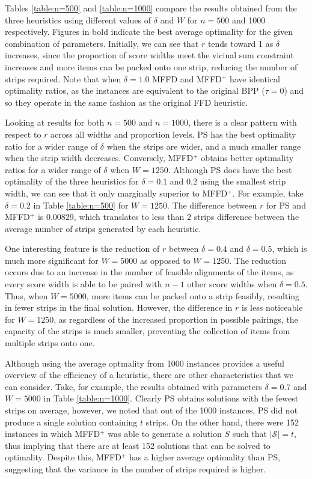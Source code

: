 \documentclass[oribibl]{llncs}
\begin{document}
Tables \ref{table:n=500} and \ref{table:n=1000} compare the results obtained from the three heuristics using different values of $\delta$ and $W$ for $n = 500$ and 1000 respectively. Figures in bold indicate the best average optimality for the given combination of parameters. Initially, we can see that $r$ tends toward 1 as $\delta$ increases, since the proportion of score widths meet the vicinal sum constraint increases and more items can be packed onto one strip, reducing the number of strips required. Note that when $\delta = 1.0$ MFFD and MFFD$^+$ have identical optimality ratios, as the instances are equivalent to the original BPP ($\tau = 0$) and so they operate in the same fashion as the original FFD heuristic.

Looking at results for both $n = 500$ and $n = 1000$, there is a clear pattern with respect to $r$ across all widths and proportion levels. PS has the best optimality ratio for a wider range of $\delta$ when the strips are wider, and a much smaller range when the strip width decreases. Conversely, MFFD$^+$ obtains better optimality ratios for a wider range of $\delta$ when $W = 1250$. Although PS does have the best optimality of the three heuristics for $\delta = 0.1$ and 0.2 using the smallest strip width, we can see that it only marginally superior to MFFD$^+$. For example, take $\delta = 0.2$ in Table \ref{table:n=500} for $W = 1250$. The difference between $r$ for PS and MFFD$^+$ is 0.00829, which translates to less than 2 strips difference between the average number of strips generated by each heuristic.

One interesting feature is the reduction of $r$ between $\delta = 0.4$ and $\delta = 0.5$, which is much more significant for $W = 5000$ as opposed to $W = 1250$. The reduction occurs due to an increase in the number of feasible alignments of the items, as every score width is able to be paired with $n-1$ other score widths when $\delta = 0.5$. Thus, when $W = 5000$, more items can be packed onto a strip feasibly, resulting in fewer strips in the final solution. However, the difference in $r$ is less noticeable for $W = 1250$, as regardless of the increased proportion in possible pairings, the capacity of the strips is much smaller, preventing the collection of items from multiple strips onto one.

Although using the average optmality from 1000 instances provides a useful overview of the efficiency of a heuristic, there are other characteristics that we can consider. Take, for example, the results obtained with parameters $\delta = 0.7$ and $W = 5000$ in Table \ref{table:n=1000}. Clearly PS obtains solutions with the fewest strips on average, however, we noted that out of the 1000 instances, PS did not produce a single solution containing $t$ strips. On the other hand, there were 152 instances in which MFFD$^+$ was able to generate a solution $S$ such that $|\mathcal{S}| = t$, thus implying that there are at least 152 solutions that can be solved to optimality. Despite this, MFFD$^+$ has a higher average optimality than PS, suggesting that the variance in the number of strips required is higher.
\end{document}

